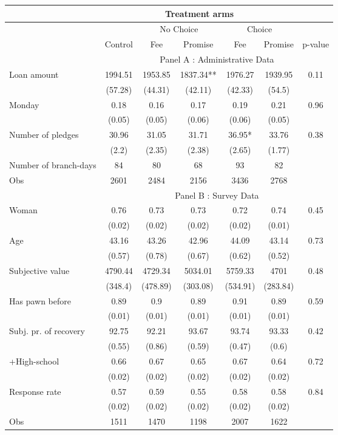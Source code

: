 \begin{tabular}{lcccccc}
\hline
   & \multicolumn{5}{c}{Treatment arms} &  \bigstrut\\
\hline
   &    & \multicolumn{2}{c}{No Choice } & \multicolumn{2}{c}{Choice} &  \bigstrut\\
\hline
\hline
   & Control & Fee  & Promise & Fee  & Promise & p-value \bigstrut\\
\hline
   & \multicolumn{6}{c}{Panel A : Administrative Data} \bigstrut\\
\hline
\hline
Loan amount  & 1994.51 & 1953.85 & 1837.34** & 1976.27 & 1939.95 & 0.11 \bigstrut[t]\\
   & (57.28) & (44.31) & (42.11) & (42.33) & (54.5) &  \\
Monday & 0.18 & 0.16 & 0.17 & 0.19 & 0.21 & 0.96 \\
   & (0.05) & (0.05) & (0.06) & (0.06) & (0.05) &  \\
Number of pledges & 30.96 & 31.05 & 31.71 & 36.95* & 33.76 & 0.38 \\
   & (2.2) & (2.35) & (2.38) & (2.65) & (1.77) &  \bigstrut[b]\\
\hline
Number of branch-days & 84 & 80 & 68 & 93 & 82 &  \bigstrut[t]\\
Obs & 2601 & 2484 & 2156 & 3436 & 2768 &  \bigstrut[b]\\
\hline
   & \multicolumn{6}{c}{Panel B : Survey Data} \bigstrut\\
\hline
\hline
Woman & 0.76 & 0.73 & 0.73 & 0.72 & 0.74 & 0.45 \bigstrut[t]\\
   & (0.02) & (0.02) & (0.02) & (0.02) & (0.01) &  \\
Age & 43.16 & 43.26 & 42.96 & 44.09 & 43.14 & 0.73 \\
   & (0.57) & (0.78) & (0.67) & (0.62) & (0.52) &  \\
Subjective value & 4790.44 & 4729.34 & 5034.01 & 5759.33 & 4701 & 0.48 \\
   & (348.4) & (478.89) & (303.08) & (534.91) & (283.84) &  \\
Has pawn before & 0.89 & 0.9 & 0.89 & 0.91 & 0.89 & 0.59 \\
   & (0.01) & (0.01) & (0.01) & (0.01) & (0.01) &  \\
Subj. pr. of recovery & 92.75 & 92.21 & 93.67 & 93.74 & 93.33 & 0.42 \\
   & (0.55) & (0.86) & (0.59) & (0.47) & (0.6) &  \\
+High-school & 0.66 & 0.67 & 0.65 & 0.67 & 0.64 & 0.72 \\
   & (0.02) & (0.02) & (0.02) & (0.02) & (0.02) &  \\
Response rate & 0.57 & 0.59 & 0.55 & 0.58 & 0.58 & 0.84 \\
   & (0.02) & (0.02) & (0.02) & (0.02) & (0.02) &  \bigstrut[b]\\
\hline
Obs & 1511 & 1470 & 1198 & 2007 & 1622 &  \bigstrut\\
\hline
\hline
\end{tabular}%
